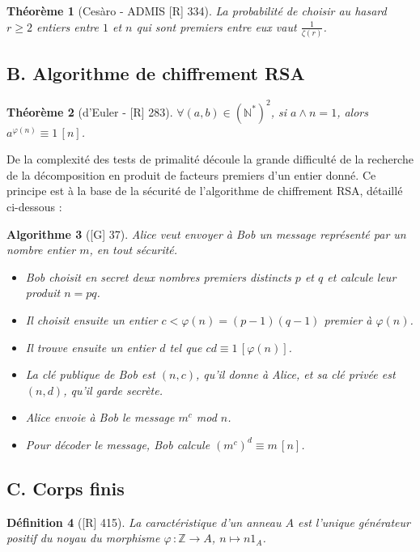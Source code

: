 \documentclass[10pt, a4paper, parskip=full, twoside, twocolumn]{report}
\newtheorem{definition}{Définition}
\newtheorem{theorem}[definition]{Théorème}
\newtheorem{algorithm}[definition]{Algorithme}
\newcommand{\IN}{\mathbb{N}}
\newcommand{\IZ}{\mathbb{Z}}
\begin{document}
\begin{theorem}[Cesàro - ADMIS \textnormal{[R] 334}]
	La probabilité de choisir au hasard $r\geq 2$ entiers entre $1$ et $n$ qui sont premiers entre eux vaut $\frac{1}{\zeta(r)}$.
\end{theorem}

\subsection*{B. Algorithme de chiffrement RSA}

\begin{theorem}[d'Euler - \textnormal{[R] 283}]
	$\forall (a,b)\in\left(\IN^*\right)^2$, si $a\wedge n = 1$, alors $a^{\varphi(n)} \equiv 1\,[n]$.
\end{theorem}

De la complexité des tests de primalité découle la grande difficulté de la recherche de la décomposition en produit de facteurs premiers d'un entier donné.
Ce principe est à la base de la sécurité de l'algorithme de chiffrement RSA, détaillé ci-dessous :

\begin{algorithm}[\textnormal{[G] 37}]
	Alice veut envoyer à Bob un message représenté par un nombre 
entier $m$, en tout sécurité.
\begin{itemize}
	\item Bob choisit en secret deux nombres premiers distincts $p$ et $q$ et calcule leur produit $n=pq$.
	\item Il choisit ensuite un entier $c<\varphi(n)=(p-1)(q-1)$ premier à $\varphi(n)$.
	\item Il trouve ensuite un entier $d$ tel que $cd \equiv 1\,[\varphi(n)]$.
	\item La clé publique de Bob est $(n,c)$, qu'il donne à Alice, et sa clé privée est $(n,d)$, qu'il garde secrète.
	\item Alice envoie à Bob le message $m^c$ mod $n$.
	\item Pour décoder le message, Bob calcule $\left(m^c\right)^d\equiv m\,[n]$.
\end{itemize}
\end{algorithm}

\subsection*{C. Corps finis}
\begin{definition}[\textnormal{[R] 415}]
	La \emph{caractéristique} d'un anneau $A$ est l'unique générateur positif du noyau du morphisme $\varphi\,\colon\IZ\to A$, $n\mapsto n1_A$.
\end{definition}
\end{document}
